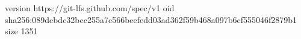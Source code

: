 version https://git-lfs.github.com/spec/v1
oid sha256:089dcbdc32bcc255a7c566beefedd03ad362f59b468a097b6cf555046f2879b1
size 1351

